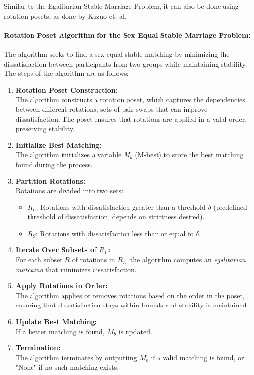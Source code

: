 Similar to the Egalitarian Stable Marriage Problem, it can also be done using rotation posets, as done by Kazuo et. al\cite{equalstable}.

\paragraph{Rotation Poset Algorithm for the Sex Equal Stable Marriage Problem: }

The algorithm seeks to find a sex-equal stable matching by minimizing the dissatisfaction between participants from two groups while maintaining stability. The steps of the algorithm are as follows:

\begin{enumerate}
    \item \textbf{Rotation Poset Construction:} \\
    The algorithm constructs a rotation poset, which captures the dependencies between different rotations, sets of pair swaps that can improve dissatisfaction. The poset ensures that rotations are applied in a valid order, preserving stability.

    \item \textbf{Initialize Best Matching:} \\
    The algorithm initializes a variable $M_b$ (M-best) to store the best matching found during the process.
    
    \item \textbf{Partition Rotations:} \\
    Rotations are divided into two sets:
    \begin{itemize}
        \item \( R_L \): Rotations with dissatisfaction greater than a threshold \( \delta \) (predefined threshold of dissatisfaction, depends on strictness desired).
        \item \( R_S \): Rotations with dissatisfaction less than or equal to \( \delta \).
    \end{itemize}
    
    \item \textbf{Iterate Over Subsets of \( R_L \):} \\
    For each subset \( R \) of rotations in \( R_L \), the algorithm computes an \emph{egalitarian matching} that minimizes dissatisfaction.

    \item \textbf{Apply Rotations in Order:} \\
    The algorithm applies or removes rotations based on the order in the poset, ensuring that dissatisfaction stays within bounds and stability is maintained.

    \item \textbf{Update Best Matching:} \\
    If a better matching is found, $M_b$ is updated.
    
    \item \textbf{Termination:} \\
    The algorithm terminates by outputting $M_b$ if a valid matching is found, or "None" if no such matching exists.
\end{enumerate}

